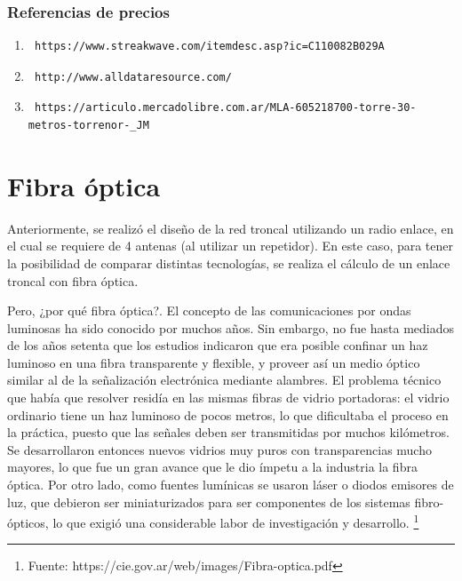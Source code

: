 \documentclass[12pt,a4paper]{book}
\begin{document}
\subsubsection{Referencias de precios}
\begin{enumerate}
\item \label{cost_radio_1} 
\begin{verbatim} https://www.streakwave.com/itemdesc.asp?ic=C110082B029A \end{verbatim} 
\item \label{cost_radio_2}
\begin{verbatim} http://www.alldataresource.com/ \end{verbatim}
\item  \label{cost_radio_3}
 \begin{verbatim} https://articulo.mercadolibre.com.ar/MLA-605218700-torre-30-metros-torrenor-_JM \end{verbatim}

\end{enumerate}

\section{Fibra óptica}

Anteriormente, se realizó el diseño de la red troncal utilizando un radio enlace, en el cual se requiere de 4 antenas (al utilizar un repetidor). En este caso, para tener la posibilidad de comparar distintas tecnologías, se realiza el cálculo de un enlace troncal con fibra óptica.

Pero, ¿por qué fibra óptica?. El concepto de las comunicaciones por ondas luminosas ha sido conocido por muchos años.
Sin embargo, no fue hasta mediados de los años setenta que los estudios indicaron que era posible confinar un haz luminoso en una fibra transparente y flexible, y proveer así un medio óptico similar al de la señalización electrónica mediante alambres.
El problema técnico que había que resolver residía en las mismas fibras de vidrio portadoras: el vidrio ordinario tiene un haz luminoso de pocos metros, lo que dificultaba el proceso en la práctica, puesto que las señales deben ser transmitidas por muchos kilómetros.
Se desarrollaron entonces nuevos vidrios muy puros con transparencias mucho mayores, lo que fue un gran avance que le dio ímpetu a la industria la fibra óptica.
Por otro lado, como fuentes lumínicas se usaron láser o diodos emisores de luz, que debieron ser miniaturizados para ser componentes de los sistemas fibro-ópticos, lo que exigió una considerable labor de investigación y desarrollo. \footnote{Fuente: https://cie.gov.ar/web/images/Fibra-optica.pdf}
\end{document}

